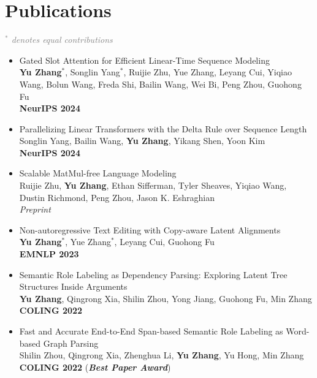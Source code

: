 \documentclass[a4paper,12pt]{article}
\begin{document}
\section{Publications} 
\textcolor{gray}{\emph{$^*$ denotes equal contributions}}


\begin{itemize}[leftmargin=18pt]
\item Gated Slot Attention for Efficient Linear-Time Sequence Modeling \\
    \textbf{Yu Zhang$^*$}, Songlin Yang$^*$, Ruijie Zhu, Yue Zhang, Leyang Cui, Yiqiao Wang, Bolun Wang, Freda Shi, Bailin Wang, Wei Bi, Peng Zhou, Guohong Fu \\
    \textbf{NeurIPS 2024}
\item Parallelizing Linear Transformers with the Delta Rule over Sequence Length \\
    Songlin Yang, Bailin Wang, \textbf{Yu Zhang}, Yikang Shen, Yoon Kim \\
    \textbf{NeurIPS 2024}
\item Scalable MatMul-free Language Modeling \\
    Ruijie Zhu, \textbf{Yu Zhang}, Ethan Sifferman, Tyler Sheaves, Yiqiao Wang, Dustin Richmond, Peng Zhou, Jason K. Eshraghian \\
    \emph{Preprint}
\item Non-autoregressive Text Editing with Copy-aware Latent Alignments \\
    \textbf{Yu Zhang$^*$}, Yue Zhang$^*$, Leyang Cui, Guohong Fu\\
    \textbf{EMNLP 2023}
\item Semantic Role Labeling as Dependency Parsing: Exploring Latent Tree Structures Inside Arguments\\
    \textbf{Yu Zhang}, Qingrong Xia, Shilin Zhou, Yong Jiang, Guohong Fu, Min Zhang\\
    \textbf{COLING 2022}
\item Fast and Accurate End-to-End Span-based Semantic Role Labeling as Word-based Graph Parsing\\
    Shilin Zhou, Qingrong Xia, Zhenghua Li, \textbf{Yu Zhang}, Yu Hong, Min Zhang\\
    \textbf{COLING 2022} (\textbf{\emph{\textcolor{brickred}{Best Paper Award}}})

\end{itemize}
\end{document}
